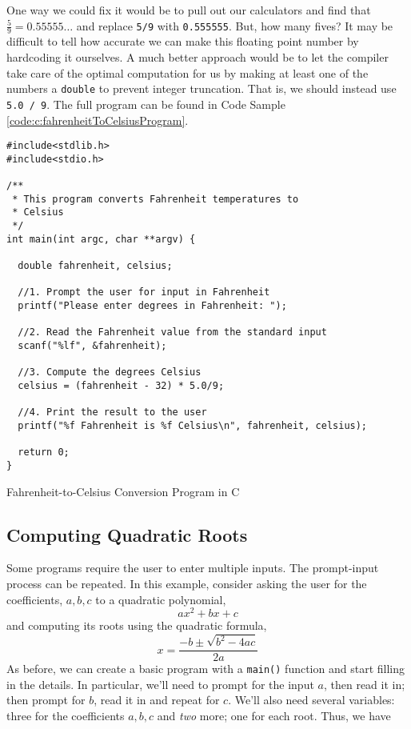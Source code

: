 One way we could fix it would be to pull out our calculators and find that
$\frac{5}{9} = 0.55555\ldots$ and replace \texttt{5/9} with \texttt{0.555555}.
But, how many fives?  It may be difficult to tell how accurate we can make
this floating point number by hardcoding it ourselves.  A much better approach
would be to let the compiler take care of the optimal computation for us by
making at least one of the numbers a \texttt{double} to prevent
integer truncation.  That is, we should instead use \texttt{5.0 / 9}.
The full program can be found in Code Sample \ref{code:c:fahrenheitToCelsiusProgram}.

\begin{listing}[!h]
\begin{verbatim}
#include<stdlib.h>
#include<stdio.h>

/**
 * This program converts Fahrenheit temperatures to 
 * Celsius
 */
int main(int argc, char **argv) {

  double fahrenheit, celsius;
  
  //1. Prompt the user for input in Fahrenheit
  printf("Please enter degrees in Fahrenheit: ");
  
  //2. Read the Fahrenheit value from the standard input
  scanf("%lf", &fahrenheit);
  
  //3. Compute the degrees Celsius
  celsius = (fahrenheit - 32) * 5.0/9;
  
  //4. Print the result to the user
  printf("%f Fahrenheit is %f Celsius\n", fahrenheit, celsius);
  
  return 0;
}
\end{verbatim}
\caption{Fahrenheit-to-Celsius Conversion Program in C}
\label{code:c:fahrenheitToCelsiusProgram}
\end{listing}

\subsection{Computing Quadratic Roots}

Some programs require the user to enter multiple inputs.  The 
prompt-input process can be repeated.  In this example, consider asking
the user for the coefficients, $a, b, c$ to a quadratic polynomial, 
  $$ax^2 + bx + c$$
and computing its roots using the quadratic formula, 
  $$x = \frac{-b \pm \sqrt{b^2 - 4ac}}{2a}$$
As before, we can create a basic program with a \texttt{main()}
function and start filling in the details.  In particular, we'll need to prompt
for the input $a$, then read it in; then prompt for $b$, read it in and
repeat for $c$.  We'll also need several variables: three for the coefficients
$a, b, c$ and \emph{two} more; one for each root.  Thus, we have 

